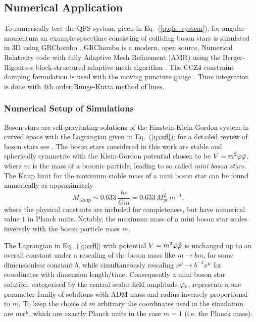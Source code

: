 \subsection{Numerical Application} \label{q:sect:results}
To numerically test the QFS system, given in Eq.~(\ref{q:qfs_system}), for angular momentum an example spacetime consisting of colliding boson stars is simulated in 3D using {\sc GRChombo} \cite{clough2015grchombo} \cite{Andrade2021}. {\sc GRChombo} is a modern, open source, Numerical Relativity code with fully Adaptive Mesh Refinement (AMR) using the Berger-Rigoutsos block-structured adaptive
mesh algorithm \cite{PhysRevD.67.104005}. The CCZ4 constraint damping formulation \cite{PhysRevD.67.104005,PhysRevD.85.064040} is used with the moving puncture gauge \cite{PhysRevLett.96.111101,PhysRevLett.96.111102}. Time integration is done with 4th order Runge-Kutta method of lines.




\subsubsection{Numerical Setup of Simulations}

Boson stars are self-gravitating solutions of the Einstein-Klein-Gordon
system in curved space with the Lagrangian given in
Eq.~(\ref{q:csfl}); for a detailed review of boson stars
see \cite{liebling2017dynamical}. The boson stars
considered in this work are stable and spherically symmetric with
the Klein-Gordon potential chosen to be $V=m^2 \varphi \bar{\varphi}$, where $m$
is the mass of a bosonic particle, leading to so called {\it mini boson stars}.
The Kaup limit for the maximum stable mass of a mini boson star can be found numerically
as approximately
\begin{equation} M_{\mathrm{Kaup}} \sim 0.633 ~\frac{\hbar c}{G m} =
0.633 ~M_{pl}^2 ~m^{-1}, \end{equation}
where the physical constants are included for completeness, but have numerical
value $1$ in Planck units. Notably, the maximum mass of a mini boson star scales
inversely with the boson particle mass $m$.

The Lagrangian in Eq.~(\ref{q:csfl}) with potential $V=m^2 \varphi \bar{\varphi}$ is unchanged up to an overall constant under a rescaling of the boson mass like $m \rightarrow b m$, for some dimensionless constant $b$, while simultaneously rescaling $x^\mu \rightarrow b^{-1} x^\mu$ for coordinates with dimension length/time. Consequently a mini boson star solution, categorised by the central scalar field amplitude $\varphi_c$, represents a one parameter family of solutions with ADM mass and radius inversely proportional to $m$. To keep the choice of $m$ arbitrary the coordinates used in the simulation are $m x^\mu$, which are exactly Planck units in the case $m=1$ (i.e. the Planck mass).



